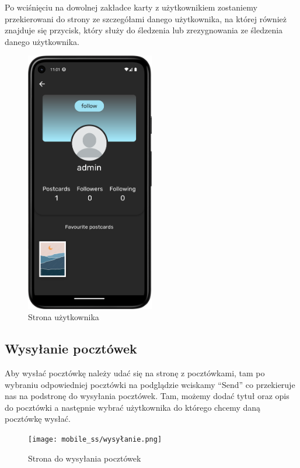 \documentclass[a4paper,twoside,12pt]{book}
\begin{document}
Po wciśnięciu na dowolnej zakładce karty z użytkownikiem zostaniemy przekierowani do strony ze szczegółami danego użytkownika, na której również znajduje się przycisk, który służy do śledzenia lub zrezygnowania ze śledzenia danego użytkownika. 

\begin{figure}[H]
    \centering
    \includegraphics[width=0.5\textwidth]{mobile_ss/friend.png}
    \caption{Strona użytkownika}
\end{figure}

\subsection{Wysyłanie pocztówek}
Aby wysłać pocztówkę należy udać się na stronę z pocztówkami, tam po wybraniu odpowiedniej pocztówki na podglądzie wciskamy ``Send'' co przekieruje nas na podstronę do wysyłania pocztówek. Tam, możemy dodać tytuł oraz opis do pocztówki a następnie wybrać użytkownika do którego chcemy daną pocztówkę wysłać. 

\begin{figure}[H]
    \centering
    \texttt{[image: mobile\_ss/wysyłanie.png]}
    \caption{Strona do wysyłania pocztówek}
\end{figure}

\end{document}
